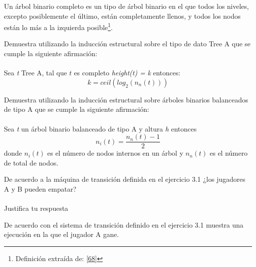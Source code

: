 	\begin{definition}
Un árbol binario completo es un tipo de árbol binario en el que todos los niveles, excepto posiblemente el último, están completamente llenos, y todos los nodos están lo más a la izquierda posible\footnote{Definición extraída de: \hyperlink{68}{[68]}}.
	\end{definition}

    \begin{exercise}
        Demuestra utilizando la inducción estructural sobre el tipo de dato Tree A que se cumple la siguiente afirmación:\\\\
        Sea \textit{t} Tree A, tal que $t$ es completo \textit{height(t) = k} entonces:
        \[ k = ceil(log_{2}(n_n(t)))\]
    \end{exercise}

    \begin{exercise}
Demuestra utilizando la inducción estructural sobre árboles binarios balanceados de tipo A que se cumple la siguiente afirmación:\\\\
        Sea \textit{t} un árbol binario balanceado de tipo A y altura \textit{h} entonces
        \[   n_i(t) = \frac{n_n(t) - 1}{2} \] donde $n_i(t)$ es el número de nodos internos en un árbol y $n_n(t)$ es el número de total de nodos.
    \end{exercise}

    \begin{exercise}
        De acuerdo a la máquina de transición definida en el ejercicio 3.1 ¿los jugadores A y B pueden empatar?\\\\
        Justifica tu respuesta
    \end{exercise}

    \begin{exercise}
        De acuerdo con el sistema de transición definido en el ejercicio 3.1 muestra una ejecución en la que el jugador A gane.
    \end{exercise}

